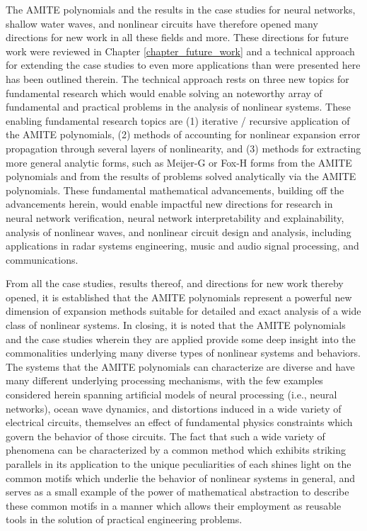 The AMITE polynomials and the results in the case studies for neural networks, shallow water waves, and nonlinear circuits have therefore opened many directions for new work in all these fields and more.  These directions for future work were reviewed in Chapter \ref{chapter_future_work} and a technical approach for extending the case studies to even more applications than were presented here has been outlined therein.  The technical approach rests on three new topics for fundamental research which would enable solving an noteworthy array of fundamental and practical problems in the analysis of nonlinear systems.  These enabling fundamental research topics are (1) iterative / recursive application of the AMITE polynomials, (2) methods of accounting for nonlinear expansion error propagation through several layers of nonlinearity, and (3) methods for extracting more general analytic forms, such as Meijer-G or Fox-H forms from the AMITE polynomials and from the results of problems solved analytically via the AMITE polynomials.  These fundamental mathematical advancements, building off the advancements herein, would enable impactful new directions for research in neural network verification, neural network interpretability and explainability, analysis of nonlinear waves, and nonlinear circuit design and analysis, including applications in radar systems engineering, music and audio signal processing, and communications.

From all the case studies, results thereof, and directions for new work thereby opened, it is established that the AMITE polynomials represent a powerful new dimension of expansion methods suitable for detailed and exact analysis of a wide class of nonlinear systems.  In closing, it is noted that the AMITE polynomials and the case studies wherein they are applied provide some deep insight into the commonalities underlying many diverse types of nonlinear systems and behaviors.  The systems that the AMITE polynomials can characterize are diverse and have many different underlying processing mechanisms, with the few examples considered herein spanning artificial models of neural processing (i.e., neural networks), ocean wave dynamics, and distortions induced in a wide variety of electrical circuits, themselves an effect of fundamental physics constraints which govern the behavior of those circuits.  The fact that such a wide variety of phenomena can be characterized by a common method which exhibits striking parallels in its application to the unique peculiarities of each shines light on the common motifs which underlie the behavior of nonlinear systems in general, and serves as a small example of the power of mathematical abstraction to describe these common motifs in a manner which allows their employment as reusable tools in the solution of practical engineering problems.

